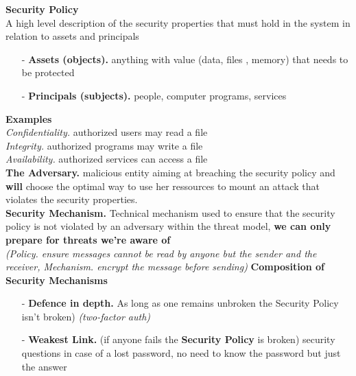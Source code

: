\documentclass[8pt]{article}
\begin{document}
\begin{minipage}[t]{0.49\textwidth}
	\noindent \textbf{Security Policy}\\
	A high level description of the security properties that must hold in the system in relation to assets and principals
	\begin{itemize}
		\item[-] \textbf{Assets (objects).} anything with value (data, files , memory) that needs to be protected
		\item[-] \textbf{Principals (subjects).} people, computer programs, services
	\end{itemize}
	\textbf{Examples}\\
	\textit{Confidentiality.} authorized users may read a file\\
	\textit{Integrity.} authorized programs may write a file\\
	\textit{Availability.} authorized services can access a file\\
	\noindent\textbf{The Adversary.} malicious entity aiming at breaching the security policy and \textbf{will} choose the optimal way to use her ressources to mount an attack that violates the security properties.\\
	\noindent \textbf{Security Mechanism.} Technical mechanism used to ensure that the security policy is not violated by an adversary within the threat model, \textbf{we can only prepare for threats we're aware of} \\\textit{(Policy. ensure messages cannot be read by anyone but the sender and the receiver, Mechanism. encrypt the message before sending)}
	\noindent \textbf{Composition of Security Mechanisms}
	\begin{itemize}
		\item[-] \textbf{Defence in depth.} As long as one remains unbroken the Security Policy isn't broken) \textit{(two-factor auth)}
		\item[-] \textbf{Weakest Link.} (if anyone fails the \textbf{Security Policy} is broken) security questions in case of a lost password, no need to know the password but just the answer
	\end{itemize}
\end{minipage}
\newpage
\setlength{\parindent}{0pt}
\setlength{\parskip}{0pt}



\footnotesize  %

\begingroup
\setlength{\abovedisplayskip}{3pt}
\setlength{\belowdisplayskip}{3pt}
\setlength{\abovedisplayshortskip}{2pt}
\setlength{\belowdisplayshortskip}{2pt}
\end{document}
